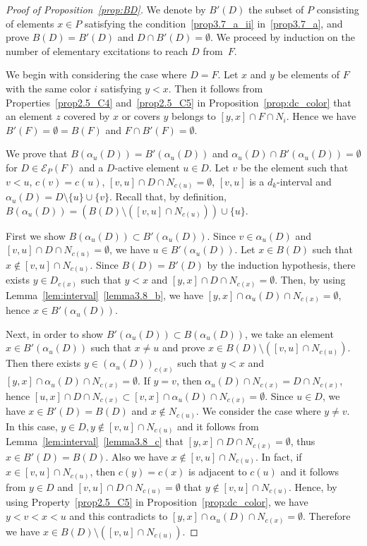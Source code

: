 \documentclass[10pt]{amsart}
\theoremstyle{definition}
\theoremstyle{remark}
\newcommand\EE{\mathcal{E}}
\begin{document}
\begin{proof}[Proof of Proposition~\ref{prop:BD}]
We denote by $B'(D)$ the subset of $P$ consisting of elements $x \in P$ satisfying the condition~\ref{prop3.7_a_ii} in~\ref{prop3.7_a},
and prove $B(D) = B'(D)$ and $D \cap B'(D) = \emptyset$.
We proceed by induction on the number of elementary excitations to reach $D$ from~$F$.

We begin with considering the case where $D = F$.
Let $x$ and $y$ be elements of $F$ with the same color $i$ satisfying $y<x$.
Then it follows from Properties~\ref{prop2.5_C4} and~\ref{prop2.5_C5} in Proposition~\ref{prop:dc_color} that 
an element $z$ covered by $x$ or covers $y$ belongs to $[y,x] \cap F \cap N_i$.
Hence we have $B'(F) = \emptyset = B(F)$ and $F \cap B'(F) = \emptyset$.

We prove that $B(\alpha_u(D)) = B'(\alpha_u(D))$ and $\alpha_u(D) \cap B'(\alpha_u(D)) = \emptyset$ 
for $D \in \EE_P(F)$ and a $D$-active element $u \in D$.
Let $v$ be the element such that $v<u$,
$c(v)=c(u)$, $[v,u] \cap D \cap N_{c(u)} = \emptyset$,
$[v,u]$ is a $d_k$-interval
and $\alpha_u(D) = D \setminus \{ u \} \cup \{ v \}$.
Recall that, by definition, 
$B(\alpha_u(D)) = \left( B(D) \setminus ([v,u] \cap N_{c(u)}) \right) \cup \{ u \}$.

First we show $B(\alpha_u(D)) \subset B'(\alpha_u(D))$.
Since $v \in \alpha_u(D)$ and $[v,u] \cap D \cap N_{c(u)} = \emptyset$, 
we have $u \in B'(\alpha_u(D))$.
Let $x \in B(D)$ such that $x \not\in [v,u] \cap N_{c(u)}$.
Since $B(D) = B'(D)$ by the induction hypothesis, 
there exists $y \in D_{c(x)}$ such that $y<x$ and $[y,x] \cap D \cap N_{c(x)} = \emptyset$.
Then, by using Lemma~\ref{lem:interval}~\ref{lemma3.8_b}, 
we have $[y,x] \cap \alpha_u(D) \cap N_{c(x)} = \emptyset$, hence $x \in B'(\alpha_u(D))$.

Next, in order to show $B'(\alpha_u(D)) \subset B(\alpha_u(D))$, 
we take an element $x \in B'(\alpha_u(D))$ such that $x \neq u$ 
and prove $x \in B(D) \setminus ([v,u] \cap N_{c(u)})$.
Then there exists $y \in (\alpha_u(D))_{c(x)}$ such that 
$y<x$ and $[y,x] \cap \alpha_u(D) \cap N_{c(x)} = \emptyset$.
If $y = v$, then $\alpha_u(D)\cap N_{c(x)}=D\cap N_{c(x)}$, 
hence $[u,x] \cap D \cap N_{c(x)} \subset [v,x] \cap \alpha_u(D) \cap N_{c(x)} = \emptyset$.
Since $u \in D$, we have $x \in B'(D)=B(D)$ and $x \not\in N_{c(u)}$.
We consider the case where $y \neq v$.
In this case, $y \in D, y\not\in [v,u]\cap N_{c(u)}$ 
and it follows from Lemma~\ref{lem:interval}~\ref{lemma3.8_c} 
that $[y,x] \cap D \cap N_{c(x)} = \emptyset$,
thus $x\in B'(D)=B(D)$.
Also we have $x \not\in [v,u] \cap N_{c(u)}$.
In fact, if $x \in [v,u] \cap N_{c(u)}$, 
then $c(y) = c(x)$ is adjacent to $c(u)$ 
and it follows from $y \in D$ and $[v,u] \cap D \cap N_{c(u)} = \emptyset$ that $y \not\in [v,u]\cap N_{c(u)}$.
Hence, by using Property~\ref{prop2.5_C5} in Proposition~\ref{prop:dc_color}, 
we have $y < v < x < u$ and 
this contradicts to $[y,x] \cap \alpha_u(D) \cap N_{c(x)} = \emptyset$.
Therefore we have $x \in B(D) \setminus ([v,u] \cap N_{c(u)})$.


\end{proof}
\end{document}
